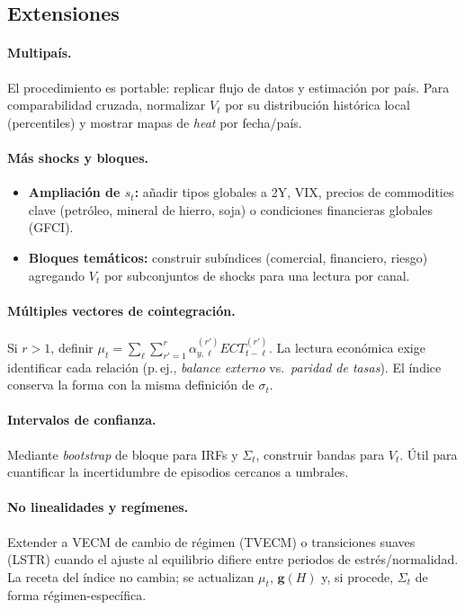 \documentclass[11pt,a4paper]{article}
\newcommand{\1}{\mathbf{1}}
\newcommand{\vect}[1]{\boldsymbol{#1}}
\begin{document}
\subsection{Extensiones}

\paragraph{Multipaís.}
El procedimiento es portable: replicar flujo de datos y estimación por país. 
Para comparabilidad cruzada, normalizar $V_t$ por su distribución histórica local (percentiles) y mostrar mapas de \emph{heat} por fecha/país.

\paragraph{Más shocks y bloques.}
\begin{itemize}
  \item \textbf{Ampliación de $s_t$:} añadir tipos globales a 2Y, VIX, precios de commodities clave (petróleo, mineral de hierro, soja) o condiciones financieras globales (GFCI). 
  \item \textbf{Bloques temáticos:} construir subíndices (comercial, financiero, riesgo) agregando $V_t$ por subconjuntos de shocks para una lectura por canal.
\end{itemize}

\paragraph{Múltiples vectores de cointegración.}
Si $r>1$, definir $\mu_t=\sum_{\ell} \sum_{r'=1}^{r} \alpha_{y,\ell}^{(r')} ECT^{(r')}_{t-\ell}$.
La lectura económica exige identificar cada relación (p.\,ej., \emph{balance externo} vs.\ \emph{paridad de tasas}). 
El índice conserva la forma con la misma definición de $\sigma_t$.

\paragraph{Intervalos de confianza.}
Mediante \emph{bootstrap} de bloque para IRFs y \(\Sigma_t\), construir bandas para $V_t$. 
Útil para cuantificar la incertidumbre de episodios cercanos a umbrales.

\paragraph{No linealidades y regímenes.}
Extender a VECM de cambio de régimen (TVECM) o transiciones suaves (LSTR) cuando el ajuste al equilibrio difiere entre periodos de estrés/normalidad. 
La receta del índice no cambia; se actualizan \(\mu_t\), \(\vect{g}(H)\) y, si procede, \(\Sigma_t\) de forma régimen-específica.
\end{document}
